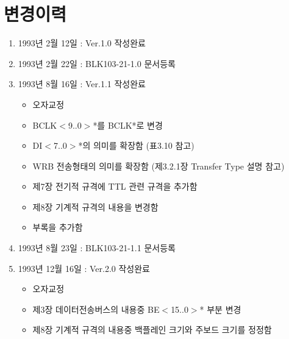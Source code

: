 \documentclass[12pt]{book}
\begin{document}
\chapter*{변경이력}
%
\begin{enumerate}
  \item 1993년 2월 12일 : Ver.1.0 작성완료
  \item 1993년 2월 22일 : BLK103-21-1.0 문서등록
  \item 1993년 8월 16일 : Ver.1.1 작성완료
	\begin{itemize}
	  \item 오자교정
	  \item BCLK$<$9..0$>$*를 BCLK*로 변경
	  \item DI$<$7..0$>$*의 의미를 확장함 (표3.10 참고)
	  \item WRB 전송형태의 의미를 확장함 (제3.2.1장 Transfer Type 설명 참고)
	  \item 제7장 전기적 규격에 TTL 관련 규격을 추가함
	  \item 제8장 기계적 규격의 내용을 변경함
	  \item 부록을 추가함
	\end{itemize}
  \item 1993년 8월 23일 : BLK103-21-1.1 문서등록
  \item 1993년 12월 16일 : Ver.2.0 작성완료
	\begin{itemize}
	  \item 오자교정
	  \item 제3장 데이터전송버스의 내용중 BE$<$15..0$>$* 부분 변경
	  \item 제8장 기계적 규격의 내용중 백플레인 크기와 주보드 크기를 정정함
	\end{itemize}
\end{enumerate}
\clearpage
{}








\appendix

\clearpage

\end{document}
